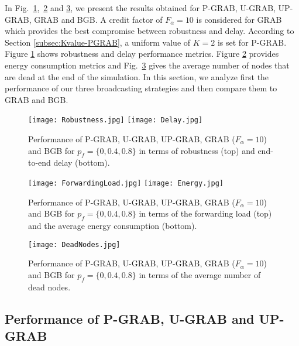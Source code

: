 \documentclass[journal, peerreview, onecolumn, draftcls]{IEEEtran}
\begin{document}
In Fig.~\ref{fig:resGGRAB-RobDel},~\ref{fig:resGGRAB-ForEn} and \ref{fig:resGGRAB-Dead}, we present the results obtained for P-GRAB, U-GRAB, UP-GRAB, GRAB and BGB. A credit factor of $F_\alpha = 10$ is considered for GRAB which provides the best compromise between robustness and delay.
According to Section \ref{subsec:Kvalue-PGRAB}, a uniform value of $K=2$ is set for P-GRAB. Figure \ref{fig:resGGRAB-RobDel} shows robustness and delay performance metrics. Figure \ref{fig:resGGRAB-ForEn} provides energy consumption metrics and Fig.~\ref{fig:resGGRAB-Dead} gives the average number of nodes that are dead at the end of the simulation.
In this section, we analyze first the performance of our three broadcasting strategies and then compare them to GRAB and BGB.

\begin{figure}
  \texttt{[image: Robustness.jpg]}
  \vspace{0.1in}
  \texttt{[image: Delay.jpg]}
    \caption{Performance of P-GRAB, U-GRAB, UP-GRAB, GRAB ($F_\alpha = 10$) and BGB for $p_f = \{0, 0.4, 0.8\}$ in terms of robustness (top) and end-to-end delay (bottom).}
    \label{fig:resGGRAB-RobDel}
\end{figure}


\begin{figure}
  \texttt{[image: ForwardingLoad.jpg]}
  \vspace{0.1in}
  \texttt{[image: Energy.jpg]}
    \caption{Performance of P-GRAB, U-GRAB, UP-GRAB, GRAB ($F_\alpha = 10$) and BGB for $p_f = \{0, 0.4, 0.8\}$ in terms of the forwarding load (top) and the average energy consumption (bottom).}
    \label{fig:resGGRAB-ForEn}
\end{figure}


\begin{figure}
  \texttt{[image: DeadNodes.jpg]}
        \caption{Performance of P-GRAB, U-GRAB, UP-GRAB, GRAB ($F_\alpha = 10$) and BGB for $p_f = \{0, 0.4, 0.8\}$ in terms of the average number of dead nodes.}
    \label{fig:resGGRAB-Dead}
\end{figure}


\subsection{Performance of P-GRAB, U-GRAB and UP-GRAB}
\end{document}
